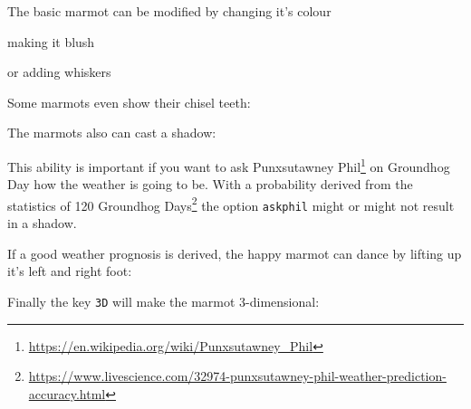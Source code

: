 \documentclass[parskip=half]{scrartcl}
\begin{document}
The basic marmot can be modified by changing it's colour

\begin{tcblisting}{}
\marmot[body=SteelBlue]
\end{tcblisting}

making it blush

\begin{tcblisting}{}
\marmot[blush]
\end{tcblisting}

or adding whiskers

\begin{tcblisting}{}
\marmot[whiskers=gray]
\end{tcblisting}

Some marmots even show their chisel teeth:

\begin{tcblisting}{}
\marmot[teeth=white]
\end{tcblisting}

The marmots also can cast a shadow:

\begin{tcblisting}{}
\marmot[shadow]
\end{tcblisting}

This ability is important if you want to ask Punxsutawney Phil\footnote{\url{https://en.wikipedia.org/wiki/Punxsutawney_Phil}} on Groundhog Day how the weather is going to be. With a probability derived from the statistics of 120 Groundhog Days\footnote{\url{https://www.livescience.com/32974-punxsutawney-phil-weather-prediction-accuracy.html}} the option \lstinline|askphil| might or might not result in a shadow.

\begin{tcblisting}{}
\marmot[askphil]
\end{tcblisting}

If a good weather prognosis is derived, the happy marmot can dance by lifting up it's left and right foot: 

\begin{tcblisting}{}
\marmot[leftstep]
\marmot[rightstep,xshift=2cm]
\end{tcblisting}

Finally the key \lstinline|3D| will make the marmot 3-dimensional:

\begin{tcblisting}{}
\marmot[3D]
\end{tcblisting}

\end{document}
